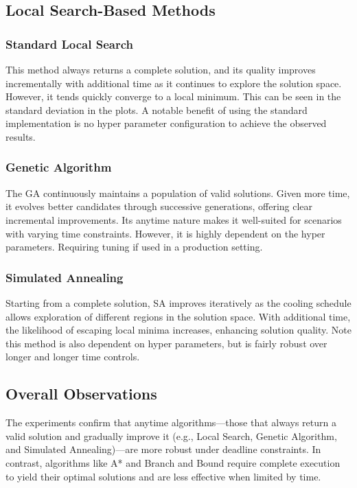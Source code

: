 \documentclass[11pt]{article}
\begin{document}
	\subsection{Local Search-Based Methods}
	\subsubsection{Standard Local Search}
	This method always returns a complete solution, and its quality improves incrementally with additional time as it continues to explore the solution space. However, it tends quickly converge to a local minimum. This can be seen in the standard deviation in the plots. A notable benefit of using the standard implementation is no hyper parameter configuration to achieve the observed results. 
	
	\subsubsection{Genetic Algorithm} 
	The GA continuously maintains a population of valid solutions. Given more time, it evolves better candidates through successive generations, offering clear incremental improvements. Its anytime nature makes it well-suited for scenarios with varying time constraints. However, it is highly dependent on the hyper parameters. Requiring tuning if used in a production setting.
	
	\subsubsection{Simulated Annealing} 
	Starting from a complete solution, SA improves iteratively as the cooling schedule allows exploration of different regions in the solution space. With additional time, the likelihood of escaping local minima increases, enhancing solution quality. Note this method is also dependent on hyper parameters, but is fairly robust over longer and longer time controls.
	
	\subsection{Overall Observations}
	The experiments confirm that anytime algorithms—those that always return a valid solution and gradually improve it (e.g., Local Search, Genetic Algorithm, and Simulated Annealing)—are more robust under deadline constraints. In contrast, algorithms like A* and Branch and Bound require complete execution to yield their optimal solutions and are less effective when limited by time.
	
\end{document}
